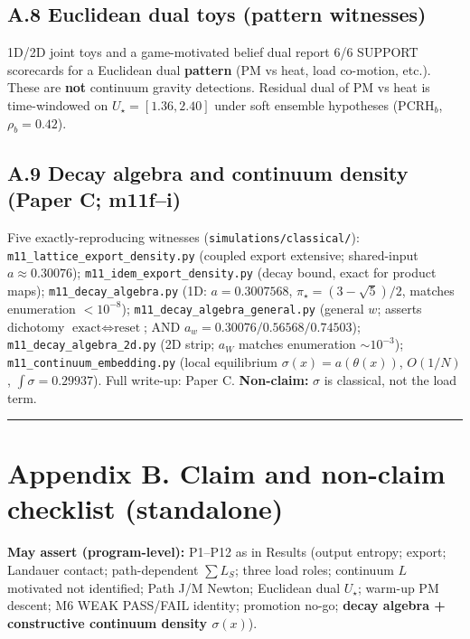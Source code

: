\documentclass[
  11pt,
]{article}
\begin{document}
\subsection{A.8 Euclidean dual toys (pattern
witnesses)}\label{a.8-euclidean-dual-toys-pattern-witnesses}

1D/2D joint toys and a game-motivated belief dual report 6/6 SUPPORT
scorecards for a Euclidean dual \textbf{pattern} (PM vs heat, load
co-motion, etc.). These are \textbf{not} continuum gravity detections.
Residual dual of PM vs heat is time-windowed on \(U_\star=[1.36,2.40]\)
under soft ensemble hypotheses (PCRH\(_b\), \(\rho_b=0.42\)).

\subsection{A.9 Decay algebra and continuum density (Paper C;
m11f--i)}\label{a.9-decay-algebra-and-continuum-density-paper-c-m11fi}

Five exactly-reproducing witnesses (\texttt{simulations/classical/}):
\texttt{m11\_lattice\_export\_density.py} (coupled export extensive;
shared-input \(a\approx0.30076\));
\texttt{m11\_idem\_export\_density.py} (decay bound, exact for product
maps); \texttt{m11\_decay\_algebra.py} (1D: \(a=0.3007568\),
\(\pi_\star=(3-\sqrt5)/2\), matches enumeration \(<10^{-8}\));
\texttt{m11\_decay\_algebra\_general.py} (general \(w\); asserts
dichotomy \(\text{exact}\Leftrightarrow\text{reset}\); AND
\(a_w=0.30076/0.56568/0.74503\)); \texttt{m11\_decay\_algebra\_2d.py}
(2D strip; \(a_W\) matches enumeration \(\sim10^{-3}\));
\texttt{m11\_continuum\_embedding.py} (local equilibrium
\(\sigma(x)=a(\theta(x))\), \(O(1/N)\), \(\int\sigma=0.29937\)). Full
write-up: Paper C. \textbf{Non-claim:} \(\sigma\) is classical, not the
load term.

\begin{center}\rule{0.5\linewidth}{0.5pt}\end{center}

\section{Appendix B. Claim and non-claim checklist
(standalone)}\label{appendix-b.-claim-and-non-claim-checklist-standalone}

\textbf{May assert (program-level):} P1--P12 as in Results (output
entropy; export; Landauer contact; path-dependent \(\sum L_S\); three
load roles; continuum \(L\) motivated not identified; Path J/M Newton;
Euclidean dual \(U_\star\); warm-up PM descent; M6 WEAK PASS/FAIL
identity; promotion no-go; \textbf{decay algebra + constructive
continuum density \(\sigma(x)\)}).
\end{document}
